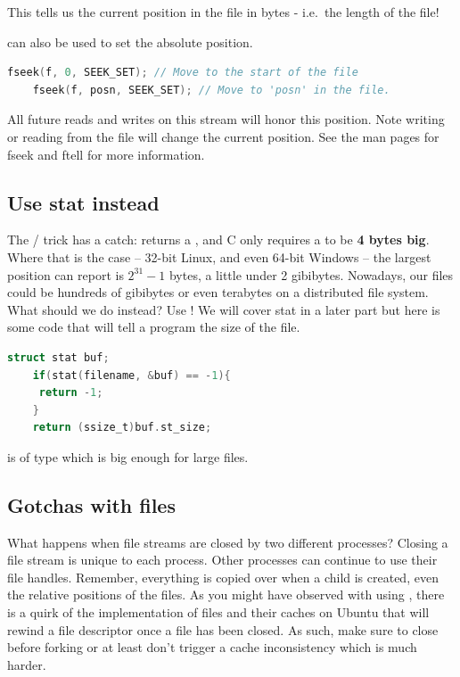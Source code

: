 This tells us the current position in the file in bytes - i.e.~the
length of the file!
	 
 can also be used to set the absolute position.
	 
\begin{lstlisting}[language=C]
	fseek(f, 0, SEEK_SET); // Move to the start of the file
	fseek(f, posn, SEEK_SET); // Move to 'posn' in the file.
\end{lstlisting}
	 
All future reads and writes on this stream will honor this position.
Note writing or reading from the file will change the current position.
See the man pages for fseek and ftell for more information.
	 
\subsection{Use stat instead}
	 
The / trick has a catch:  returns a , and C only requires a  to be \textbf{4 bytes big}.
Where that is the case -- 32-bit Linux, and even 64-bit Windows -- the largest position  can report is $2^{31}-1$ bytes, a little under 2 gibibytes.
Nowadays, our files could be hundreds of gibibytes or even terabytes on a distributed file system.
What should we do instead? Use ! We will cover stat in a later part but here is some code that will tell a program the size of the file.
	 
\begin{lstlisting}[language=C]
	struct stat buf;
	if(stat(filename, &buf) == -1){
	 return -1;
	}
	return (ssize_t)buf.st_size;
\end{lstlisting}
	 
 is of type  which is big enough for large files.
	 
\subsection{Gotchas with files}
	 
What happens when file streams are closed by two different processes?
Closing a file stream is unique to each process.
Other processes can continue to use their file handles.
Remember, everything is copied over when a child is created, even the relative positions of the files.
As you might have observed with using , there is a quirk of the implementation of files and their caches on Ubuntu that will rewind a file descriptor once a file has been closed.
As such, make sure to close before forking or at least don't trigger a cache inconsistency which is much harder.
	 
